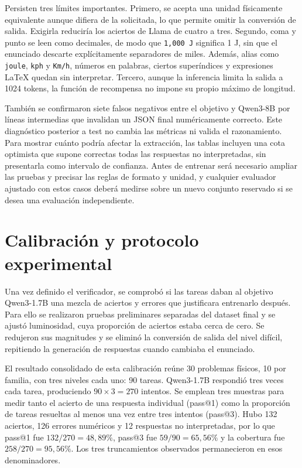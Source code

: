 Persisten tres límites importantes. Primero, se acepta una unidad físicamente
equivalente aunque difiera de la solicitada, lo que permite omitir la conversión
de salida. Exigirla reduciría los aciertos de Llama de cuatro a tres. Segundo,
coma y punto se leen como decimales, de modo que \texttt{1,000 J} significa 1 J,
sin que el enunciado descarte explícitamente separadores de miles. Además, alias
como \texttt{joule}, \texttt{kph} y \texttt{Km/h}, números en palabras, ciertos
superíndices y expresiones LaTeX quedan sin interpretar. Tercero, aunque la
inferencia limita la salida a 1024 tokens, la función de recompensa no impone
su propio máximo de longitud.

También se confirmaron siete falsos negativos entre el objetivo y Qwen3-8B
por líneas intermedias que invalidan un JSON final numéricamente correcto.
Este diagnóstico posterior a test no cambia las métricas ni valida el razonamiento. Para mostrar cuánto podría afectar la extracción, las tablas
incluyen una cota optimista que supone correctas todas las respuestas no
interpretadas, sin presentarla como intervalo de confianza. Antes de entrenar
será necesario ampliar las pruebas y precisar las reglas de formato y unidad,
y cualquier evaluador ajustado con estos casos deberá medirse sobre un nuevo
conjunto reservado si se desea una evaluación independiente.

\section{Calibración y protocolo experimental}
Una vez definido el verificador, se comprobó si las tareas daban al objetivo
Qwen3-1.7B una mezcla de aciertos y errores que justificara entrenarlo después.
Para ello se realizaron pruebas preliminares separadas del dataset final y se
ajustó luminosidad, cuya proporción de aciertos estaba cerca de cero. Se
redujeron sus magnitudes y se eliminó la conversión de salida del nivel difícil,
repitiendo la generación de respuestas cuando cambiaba el enunciado.

El resultado consolidado de esta calibración reúne 30 problemas físicos,
10 por familia, con tres niveles cada uno: 90 tareas. Qwen3-1.7B respondió
tres veces cada tarea, produciendo $90\times3=270$ intentos. Se emplean tres
muestras para medir tanto el acierto de una respuesta individual (pass@1)
como la proporción de tareas resueltas al menos una vez entre tres intentos
(pass@3). Hubo 132 aciertos, 126 errores numéricos y 12 respuestas no
interpretadas, por lo que pass@1 fue $132/270=48{,}89\%$, pass@3 fue
$59/90=65{,}56\%$ y la cobertura fue $258/270=95{,}56\%$. Los tres
truncamientos observados permanecieron en esos denominadores.

